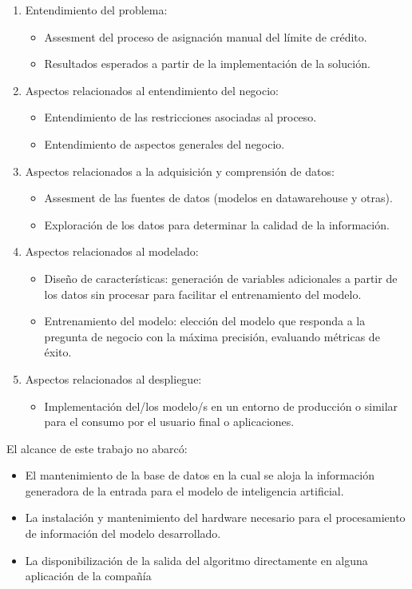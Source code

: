 \begin {enumerate}
\item Entendimiento del problema: 
	\begin {itemize}
	\item Assesment del proceso de asignación manual del límite de
crédito. 
	\item Resultados esperados a partir de la implementación de la solución.
	\end {itemize}

	
\item Aspectos relacionados al entendimiento del negocio: 
	\begin {itemize}
	\item Entendimiento de las restricciones asociadas al proceso. 
	\item Entendimiento de aspectos generales del negocio.
	\end {itemize}
	
\item Aspectos relacionados a la adquisición y comprensión de datos: 
	\begin {itemize}
	\item Assesment de las fuentes de datos (modelos en datawarehouse y otras). 
	\item Exploración de los datos para determinar la calidad de la información.
	\end {itemize}
	
\item Aspectos relacionados al modelado: 
	\begin {itemize}
	\item Diseño de características: generación de variables adicionales a partir de los datos sin procesar para facilitar 
el entrenamiento del modelo.
	\item Entrenamiento del modelo: elección del modelo que responda a la pregunta de negocio con la máxima precisión, evaluando métricas de éxito.
	\end {itemize}
	
\item Aspectos relacionados al despliegue: 
	\begin {itemize}
	\item Implementación del/los modelo/s en un entorno de producción o similar para el consumo por el usuario final o aplicaciones. 
	\end {itemize}
\end {enumerate}
 
El alcance de este trabajo no abarcó:
\begin {itemize}
\item El mantenimiento de la base de datos en la cual se aloja la información generadora de la entrada para el modelo de inteligencia artificial.
\item La instalación y mantenimiento del hardware necesario para el procesamiento de información del modelo desarrollado.
\item La disponibilización de la salida del algoritmo directamente en alguna aplicación de la compañía
\end {itemize}
